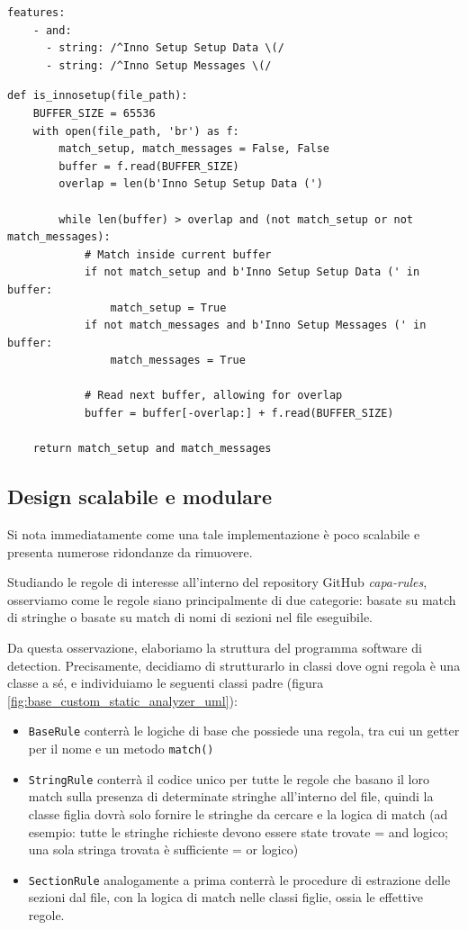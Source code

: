\begin{minipage}{\textwidth}
\begin{verbatim}
features:
    - and:
      - string: /^Inno Setup Setup Data \(/
      - string: /^Inno Setup Messages \(/
\end{verbatim}

\begin{verbatim}
def is_innosetup(file_path):
    BUFFER_SIZE = 65536
    with open(file_path, 'br') as f:
        match_setup, match_messages = False, False
        buffer = f.read(BUFFER_SIZE)
        overlap = len(b'Inno Setup Setup Data (')

        while len(buffer) > overlap and (not match_setup or not match_messages):
            # Match inside current buffer
            if not match_setup and b'Inno Setup Setup Data (' in buffer:
                match_setup = True
            if not match_messages and b'Inno Setup Messages (' in buffer:
                match_messages = True
            
            # Read next buffer, allowing for overlap
            buffer = buffer[-overlap:] + f.read(BUFFER_SIZE)
    
    return match_setup and match_messages
\end{verbatim}
\end{minipage}

\subsection{Design scalabile e modulare}
Si nota immediatamente come una tale implementazione è poco scalabile e presenta numerose ridondanze da rimuovere.

Studiando le regole di interesse all'interno del repository GitHub \textit{capa-rules}, osserviamo come le regole siano principalmente di due categorie: basate su match di stringhe o basate su match di nomi di sezioni nel file eseguibile.

Da questa osservazione, elaboriamo la struttura del programma software di detection. Precisamente, decidiamo di strutturarlo in classi dove ogni regola è una classe a sé, e individuiamo le seguenti classi padre (figura \ref{fig:base_custom_static_analyzer_uml}):
\begin{itemize}
    \item \texttt{BaseRule} conterrà le logiche di base che possiede una regola, tra cui un getter per il nome e un metodo \texttt{match()}
    \item \texttt{StringRule} conterrà il codice unico per tutte le regole che basano il loro match sulla presenza di determinate stringhe all'interno del file, quindi la classe figlia dovrà solo fornire le stringhe da cercare e la logica di match (ad esempio: tutte le stringhe richieste devono essere state trovate = and logico; una sola stringa trovata è sufficiente = or logico)
    \item \texttt{SectionRule} analogamente a prima conterrà le procedure di estrazione delle sezioni dal file, con la logica di match nelle classi figlie, ossia le effettive regole.
\end{itemize}


